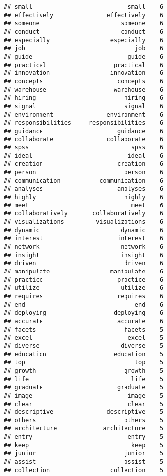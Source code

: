 \documentclass[]{article}
\begin{document}
\begin{verbatim}
## small                           small    6
## effectively               effectively    6
## someone                       someone    6
## conduct                       conduct    6
## especially                 especially    6
## job                               job    6
## guide                           guide    6
## practical                   practical    6
## innovation                 innovation    6
## concepts                     concepts    6
## warehouse                   warehouse    6
## hiring                         hiring    6
## signal                         signal    6
## environment               environment    6
## responsibilities     responsibilities    6
## guidance                     guidance    6
## collaborate               collaborate    6
## spss                             spss    6
## ideal                           ideal    6
## creation                     creation    6
## person                         person    6
## communication           communication    6
## analyses                     analyses    6
## highly                         highly    6
## meet                             meet    6
## collaboratively       collaboratively    6
## visualizations         visualizations    6
## dynamic                       dynamic    6
## interest                     interest    6
## network                       network    6
## insight                       insight    6
## driven                         driven    6
## manipulate                 manipulate    6
## practice                     practice    6
## utilize                       utilize    6
## requires                     requires    6
## end                               end    6
## deploying                   deploying    6
## accurate                     accurate    6
## facets                         facets    5
## excel                           excel    5
## diverse                       diverse    5
## education                   education    5
## top                               top    5
## growth                         growth    5
## life                             life    5
## graduate                     graduate    5
## image                           image    5
## clear                           clear    5
## descriptive               descriptive    5
## others                         others    5
## architecture             architecture    5
## entry                           entry    5
## keep                             keep    5
## junior                         junior    5
## assist                         assist    5
## collection                 collection    5

\end{verbatim}
\end{document}
